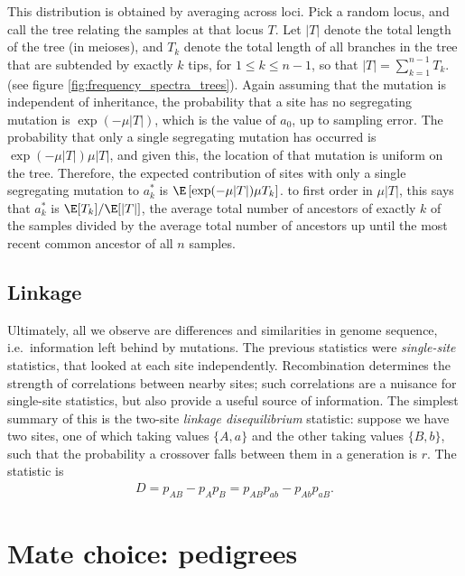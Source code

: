This distribution is obtained by averaging across loci.
Pick a random locus, and call the tree relating the samples at that locus $T$.
Let $|T|$ denote the total length of the tree (in meioses),
and $T_k$ denote the total length of all branches in the tree that are subtended by exactly $k$ tips,
for $1 \le k \le n-1$, so that $|T| = \sum_{k=1}^{n-1} T_k$.
(see figure \ref{fig:frequency_spectra_trees}).
Again assuming that the mutation is independent of inheritance,
the probability that a site has no segregating mutation is
$\exp(-\mu |T|)$, which is the value of $a_0$, up to sampling error.
The probability that only a single segregating mutation has occurred is $\exp(-\mu |T|) \mu |T|$,
and given this,
the location of that mutation is uniform on the tree.
Therefore, the expected contribution of sites with only a single segregating mutation
to $a_k^*$ is $\E\left[ \exp(-\mu |T|) \mu T_k \right]$.
to first order in $\mu |T|$, this says that $a_k^*$ is $\E[T_k]/\E[|T|]$,
the average total number of ancestors of exactly $k$ of the samples
divided by the average total number of ancestors up until the most recent common ancestor of all $n$ samples.



\subsection{Linkage}

Ultimately, all we observe are differences and similarities in genome sequence,
i.e.\ information left behind by mutations.
The previous statistics were \emph{single-site} statistics,
that looked at each site independently.
Recombination determines the strength of correlations between nearby sites;
such correlations are a nuisance for single-site statistics,
but also provide a useful source of information.
The simplest summary of this is the two-site \emph{linkage disequilibrium} statistic:
suppose we have two sites, one of which taking values $\{A,a\}$ and the other taking values $\{B,b\}$,
such that the probability a crossover falls between them in a generation is $r$.
The statistic is
\begin{align}
  D = p_{AB} - p_A p_B = p_{AB}p_{ab} - p_{Ab}p_{aB} .
\end{align}






\section{Mate choice: pedigrees}

